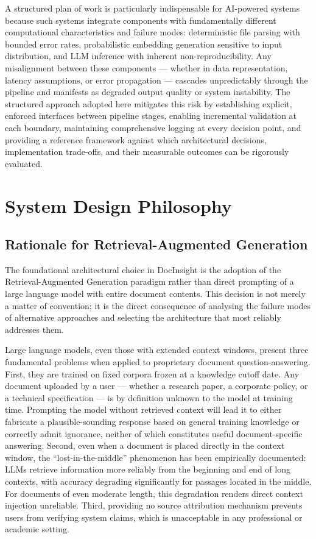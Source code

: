 A structured plan of work is particularly indispensable for AI-powered systems because such systems integrate components with fundamentally different computational characteristics and failure modes: deterministic file parsing with bounded error rates, probabilistic embedding generation sensitive to input distribution, and LLM inference with inherent non-reproducibility. Any misalignment between these components --- whether in data representation, latency assumptions, or error propagation --- cascades unpredictably through the pipeline and manifests as degraded output quality or system instability. The structured approach adopted here mitigates this risk by establishing explicit, enforced interfaces between pipeline stages, enabling incremental validation at each boundary, maintaining comprehensive logging at every decision point, and providing a reference framework against which architectural decisions, implementation trade-offs, and their measurable outcomes can be rigorously evaluated.

\section{System Design Philosophy}

\subsection{Rationale for Retrieval-Augmented Generation}

The foundational architectural choice in DocInsight is the adoption of the Retrieval-Augmented Generation paradigm rather than direct prompting of a large language model with entire document contents. This decision is not merely a matter of convention; it is the direct consequence of analysing the failure modes of alternative approaches and selecting the architecture that most reliably addresses them.

Large language models, even those with extended context windows, present three fundamental problems when applied to proprietary document question-answering. First, they are trained on fixed corpora frozen at a knowledge cutoff date. Any document uploaded by a user --- whether a research paper, a corporate policy, or a technical specification --- is by definition unknown to the model at training time. Prompting the model without retrieved context will lead it to either fabricate a plausible-sounding response based on general training knowledge or correctly admit ignorance, neither of which constitutes useful document-specific answering. Second, even when a document is placed directly in the context window, the ``lost-in-the-middle'' phenomenon has been empirically documented: LLMs retrieve information more reliably from the beginning and end of long contexts, with accuracy degrading significantly for passages located in the middle. For documents of even moderate length, this degradation renders direct context injection unreliable. Third, providing no source attribution mechanism prevents users from verifying system claims, which is unacceptable in any professional or academic setting.

